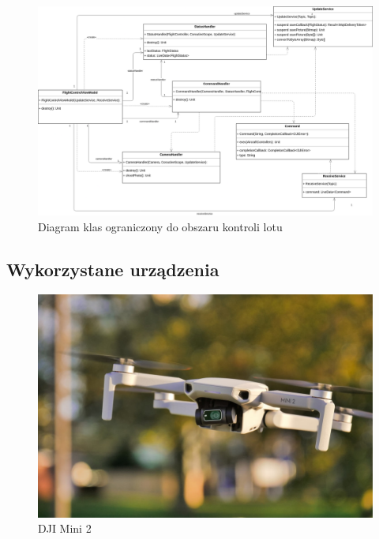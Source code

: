 \begin{figure}[!htp]
  \centering
  \includegraphics[width=16cm]{./Obrazy/handlers.png}
  \caption{Diagram klas ograniczony do obszaru kontroli lotu}
  \end{figure}

\newpage

\subsection{Wykorzystane urządzenia}
\begin{figure}[!htp]
  \centering
  \includegraphics[width=13cm]{./Obrazy/dji-mini-2.jpg}
  \caption{DJI Mini 2}
  \end{figure}

